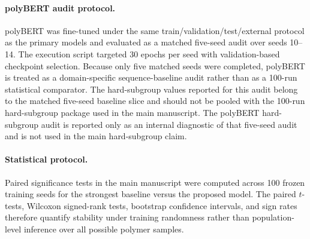 \documentclass[11pt]{article}
\begin{document}
\paragraph{polyBERT audit protocol.}
polyBERT was fine-tuned under the same train/validation/test/external protocol
as the primary models and evaluated as a matched five-seed audit over seeds
10--14. The execution script targeted 30 epochs per seed with validation-based
checkpoint selection. Because only five matched seeds were completed, polyBERT
is treated as a domain-specific sequence-baseline audit rather than as a
100-run statistical comparator. The hard-subgroup values reported for this audit
belong to the matched five-seed baseline slice and should not be pooled with the
100-run hard-subgroup package used in the main manuscript. The polyBERT
hard-subgroup audit is reported only as an internal diagnostic of that
five-seed audit and is not used in the main hard-subgroup claim.

\paragraph{Statistical protocol.}
Paired significance tests in the main manuscript were computed across 100 frozen
training seeds for the strongest baseline versus the proposed model. The paired
$t$-tests, Wilcoxon signed-rank tests, bootstrap confidence intervals, and sign
rates therefore quantify stability under training randomness rather than
population-level inference over all possible polymer samples.

\bigskip

\begin{center}
\small
{}
\end{center}
\end{document}
